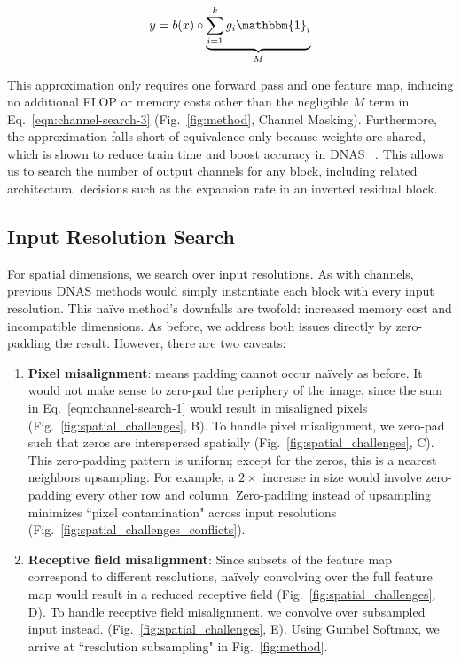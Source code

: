 \documentclass[10pt,twocolumn,letterpaper]{article}
\begin{document}
\begin{equation}\label{eqn:channel-search-3}
    y = b(x) \circ \underbrace{\sum_{i=1}^k g_i \mathbbm{1}_{i}}_{M}
\end{equation}

This approximation only requires one forward pass and one feature map, inducing no additional FLOP or memory costs other than the negligible $M$ term in Eq.~\ref{eqn:channel-search-3} (Fig.~\ref{fig:method}, Channel Masking). Furthermore, the approximation falls short of equivalence only because weights are shared, which is shown to reduce train time and boost accuracy in DNAS ~\cite{singlepathnas}. This allows us to search the number of output channels for any block, including related architectural decisions such as the expansion rate in an inverted residual block.

\subsection{Input Resolution Search}

For spatial dimensions, we search over input resolutions. As with channels, previous DNAS methods would simply instantiate each block with every input resolution. This naïve method's downfalls are twofold: increased memory cost and incompatible dimensions. As before, we address both issues directly by zero-padding the result. However, there are two caveats:

\begin{enumerate}
    \item \textbf{Pixel misalignment}: means padding cannot occur naïvely as before. It would not make sense to zero-pad the periphery of the image, since the sum in Eq.~\ref{eqn:channel-search-1} would result in misaligned pixels (Fig.~\ref{fig:spatial_challenges}, B). To handle pixel misalignment, we zero-pad such that zeros are interspersed spatially (Fig.~\ref{fig:spatial_challenges}, C). This zero-padding pattern is uniform; except for the zeros, this is a nearest neighbors upsampling. For example, a $2\times$ increase in size would involve zero-padding every other row and column. Zero-padding instead of upsampling minimizes ``pixel contamination" across input resolutions (Fig.~\ref{fig:spatial_challenges_conflicts}).
    \item \textbf{Receptive field misalignment}: Since subsets of the feature map correspond to different resolutions, naïvely convolving over the full feature map would result in a reduced receptive field (Fig.~\ref{fig:spatial_challenges}, D). To handle receptive field misalignment, we convolve over subsampled input instead. (Fig.~\ref{fig:spatial_challenges}, E). Using Gumbel Softmax, we arrive at ``resolution subsampling" in Fig.~\ref{fig:method}.
\end{enumerate}
\end{document}
